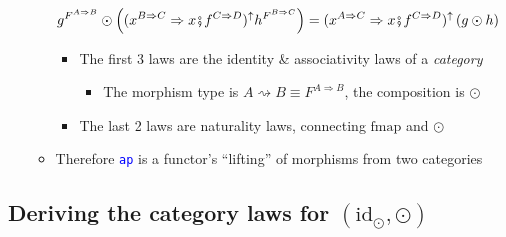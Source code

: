 \begin{itemize}
\begin{itemize}
{\begin{align*}
g^{F^{A\Rightarrow B}}\odot\left((x^{B\Rightarrow C}\Rightarrow x\bef f^{C\Rightarrow D})^{\uparrow}h^{F^{B\Rightarrow C}}\right) & =(x^{A\Rightarrow C}\Rightarrow x\bef f^{C\Rightarrow D})^{\uparrow}\left(g\odot h\right)
\end{align*}
}{\footnotesize\par}
\begin{itemize}
\item The first 3 laws are the identity \& associativity laws of a \emph{category}
\begin{itemize}
\item The morphism type is $A\rightsquigarrow B\equiv F^{A\Rightarrow B}$,
the composition is $\odot$
\end{itemize}
\item The last 2 laws are naturality laws, connecting $\text{fmap}$ and
$\odot$
\end{itemize}
\item Therefore \texttt{\textcolor{blue}{\footnotesize{}ap}} is a functor's
``lifting'' of morphisms from two categories
\end{itemize}
\end{itemize}


\subsection{Deriving the category laws for $\left(\text{id}_{\odot},\odot\right)$}

